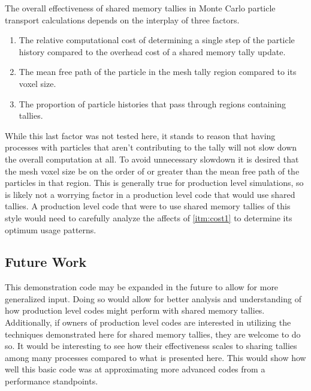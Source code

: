 \documentclass{mc2015}
\begin{document}
The overall effectiveness of shared memory tallies in Monte Carlo particle transport
calculations depends on the interplay of  three factors.
\begin{enumerate}
	\item The relative computational cost of determining a single step of
		the particle history compared to the overhead cost
		of a shared memory tally update. \label{itm:cost1}
	\item The mean free path of the particle in the mesh tally region
		compared to its voxel size.
	\item The proportion of particle histories that pass through
		regions containing tallies.
\end{enumerate}
While this last factor was not tested here,
it stands to reason that having processes with particles that aren't contributing to
the tally will not slow down the overall computation at all.
To avoid unnecessary slowdown it is desired that the mesh voxel size be on the order of
or greater than the mean free path of the particles in that region.
This is generally true for production level simulations, so is likely not
a worrying factor in a production level code that would use shared tallies.
A production level code that were to use shared memory tallies of this style would need
to carefully analyze the affects of \autoref{itm:cost1}
to determine its optimum usage patterns.

\subsection{Future Work}

This demonstration code may be expanded in the future to allow for more generalized input.
Doing so would allow for better analysis and understanding of how production level codes
might perform with shared memory tallies.
Additionally, if owners of production level codes are interested in utilizing the
techniques demonstrated here for shared memory tallies, they are welcome to do so.
It would be interesting to see how their effectiveness scales
to sharing tallies among many processes compared to what is presented here.
This would show how well this basic code was at approximating more advanced codes
from a performance standpoints.


\setlength{\baselineskip}{12pt}




\end{document}
